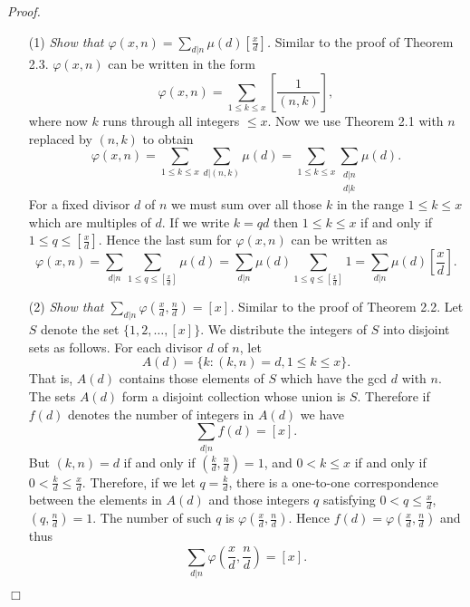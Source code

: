 \documentclass{article}
\begin{document}
\emph{Proof.}
\begin{enumerate}
\item[(1)]
  \emph{Show that $\varphi(x,n) = \sum_{d|n} \mu(d) \left[ \frac{x}{d} \right]$.}
  Similar to the proof of Theorem 2.3.
  $\varphi(x,n)$ can be written in the form
  \[
    \varphi(x,n) = \sum_{1 \leq k \leq x}\left[ \frac{1}{(n,k)} \right],
  \]
  where now $k$ runs through all integers $\leq x$.
  Now we use Theorem 2.1 with $n$ replaced by $(n,k)$ to obtain
  \[
    \varphi(x,n)
    = \sum_{1 \leq k \leq x} \sum_{d|(n,k)} \mu(d)
    = \sum_{1 \leq k \leq x} \sum_{\substack{d|n \\ d|k}} \mu(d).
  \]
  For a fixed divisor $d$ of $n$ we must sum over all those $k$ in the range $1 \leq k \leq x$
  which are multiples of $d$.
  If we write $k = qd$ then $1 \leq k \leq x$ if and only if
  $1 \leq q \leq \left[ \frac{x}{d} \right]$.
  Hence the last sum for $\varphi(x,n)$ can be written as
  \[
    \varphi(x,n)
    = \sum_{d|n} \sum_{1 \leq q \leq \left[ \frac{x}{d} \right]} \mu(d)
    = \sum_{d|n} \mu(d) \sum_{1 \leq q \leq \left[ \frac{x}{d} \right]} 1
    = \sum_{d|n} \mu(d) \left[ \frac{x}{d} \right].
  \]

\item[(2)]
  \emph{Show that $\sum_{d|n} \varphi\left( \frac{x}{d},\frac{n}{d} \right) = [x]$.}
  Similar to the proof of Theorem 2.2.
  Let $S$ denote the set $\{ 1, 2, \ldots, [x] \}$.
  We distribute the integers of $S$ into disjoint sets as follows.
  For each divisor $d$ of $n$, let
  \[
    A(d) = \{ k : (k,n) = d, 1 \leq k \leq x \}.
  \]
  That is, $A(d)$ contains those elements of $S$ which have the gcd $d$ with $n$.
  The sets $A(d)$ form a disjoint collection whose union is $S$.
  Therefore if $f(d)$ denotes the number of integers in $A(d)$ we have
  \[
    \sum_{d|n} f(d) = [x].
  \]
  But $(k,n) = d$ if and only if $\left( \frac{k}{d}, \frac{n}{d} \right) = 1$,
  and $0 < k \leq x$ if and only if $0 < \frac{k}{d} \leq \frac{x}{d}$.
  Therefore, if we let $q = \frac{k}{d}$,
  there is a one-to-one correspondence between the elements in $A(d)$
  and those integers $q$ satisfying
  $0 < q \leq \frac{x}{d}$, $\left( q, \frac{n}{d} \right) = 1$.
  The number of such $q$ is $\varphi\left( \frac{x}{d},\frac{n}{d} \right)$.
  Hence $f(d) = \varphi\left( \frac{x}{d},\frac{n}{d} \right)$ and thus
  \[
    \sum_{d|n} \varphi\left( \frac{x}{d},\frac{n}{d} \right) = [x].
  \]
\end{enumerate}
$\Box$ \\\\
\end{document}
